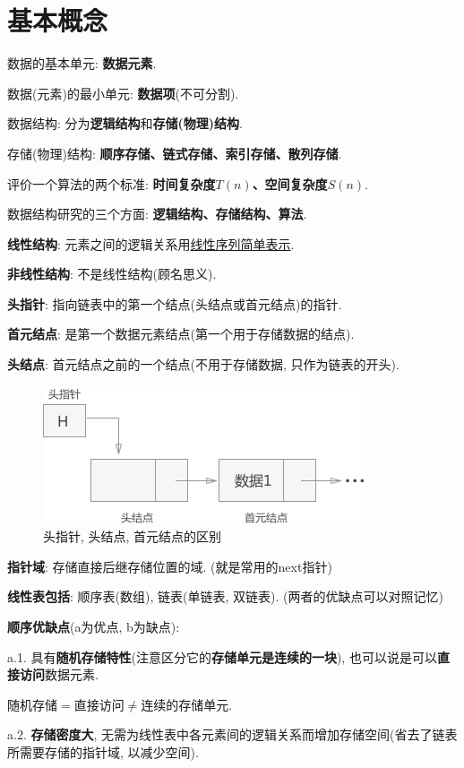 \documentclass[12pt, a4paper, oneside]{ctexart}
\def\ul{\underline}         %
\def\bf{\textbf}
\begin{document}
\section*{基本概念}

数据的基本单元: \bf{数据元素}.

数据(元素)的最小单元: \bf{数据项}(不可分割).

数据结构: 分为\bf{逻辑结构}和\bf{存储(物理)结构}.

存储(物理)结构: \bf{顺序存储、链式存储、索引存储、散列存储}.

评价一个算法的两个标准: \bf{时间复杂度$T(n)$、空间复杂度$S(n)$}.

数据结构研究的三个方面: \bf{逻辑结构、存储结构、算法}.

\bf{线性结构}: 元素之间的逻辑关系用\ul{线性序列简单表示}.

\bf{非线性结构}: 不是线性结构(顾名思义).

\bf{头指针}: 指向链表中的第一个结点(头结点或首元结点)的指针.

\bf{首元结点}: 是第一个数据元素结点(第一个用于存储数据的结点).

\bf{头结点}: 首元结点之前的一个结点(不用于存储数据, 只作为链表的开头).

\begin{figure}[htbp]
    \centering
    \includegraphics[scale=0.6]{头指针,头结点,首元结点区别.png}
    \caption{头指针, 头结点, 首元结点的区别}
\end{figure}

\bf{指针域}: 存储直接后继存储位置的域. (就是常用的next指针)

\bf{线性表包括}: 顺序表(数组), 链表(单链表, 双链表). (两者的优缺点可以对照记忆)

\bf{顺序优缺点}(a为优点, b为缺点): 

a.1. 具有\bf{随机存储特性}(注意区分它的\bf{存储单元是连续的一块}), 也可以说是可以\bf{直接访问}数据元素.

随机存储$=$直接访问$\neq$连续的存储单元.

a.2. \bf{存储密度大}, 无需为线性表中各元素间的逻辑关系而增加存储空间(省去了链表所需要存储的指针域, 以减少空间).
\end{document}
